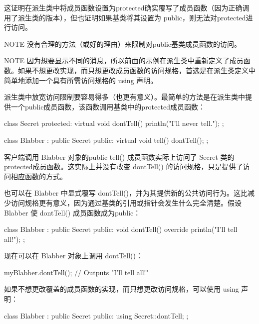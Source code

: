 这证明在派生类中将成员函数设置为protected确实覆写了成员函数（因为正确调用了派生类的版本），但也证明如果基类将其设置为 public，则无法对protected进行访问。

\begin{myNotic}{NOTE}
没有合理的方法（或好的理由）来限制对public基类成员函数的访问。
\end{myNotic}

\begin{myNotic}{NOTE}
因为想要显示不同的消息，所以前面的示例在派生类中重新定义了成员函数。如果不想更改实现，而只想更改成员函数的访问规格，首选是在派生类定义中简单地添加一个具有所需访问规格的 using 声明。
\end{myNotic}

派生类中放宽访问限制要容易得多（也更有意义）。最简单的方法是在派生类中提供一个public成员函数，该函数调用基类中的protected成员函数：

\begin{cpp}
class Secret
{
    protected:
        virtual void dontTell() { println("I'll never tell."); }
};

class Blabber : public Secret
{
    public:
        virtual void tell() { dontTell(); }
};
\end{cpp}

客户端调用 Blabber 对象的public tell() 成员函数实际上访问了 Secret 类的protected成员函数。这实际上并没有改变 dontTell() 的访问规格，只是提供了访问相应函数的方式。

也可以在 Blabber 中显式覆写 dontTell()，并为其提供新的公共访问行为。这比减少访问规格更有意义，因为通过基类的引用或指针会发生什么完全清楚。假设 Blabber 使 dontTell() 成员函数成为public：

\begin{cpp}
class Blabber : public Secret
{
    public:
        void dontTell() override { println("I'll tell all!"); }
};
\end{cpp}

现在可以在 Blabber 对象上调用 dontTell()：

\begin{cpp}
myBlabber.dontTell(); // Outputs "I'll tell all!"
\end{cpp}

如果不想更改覆盖的成员函数的实现，而只想更改访问规格，可以使用 using 声明：

\begin{cpp}
class Blabber : public Secret
{
    public:
        using Secret::dontTell;
};
\end{cpp}

